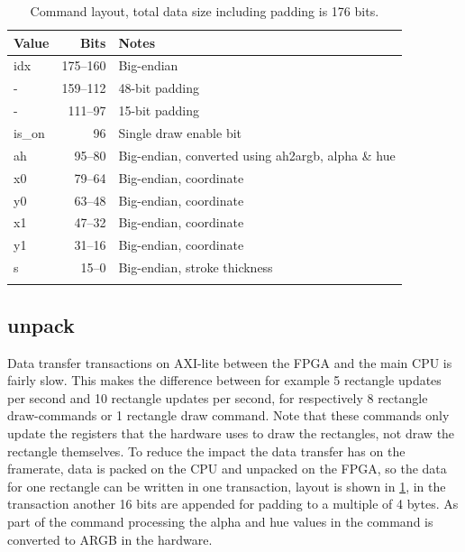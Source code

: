 \documentclass[conference]{IEEEtran}
\begin{document}
\begin{table}[h]
    \centering
    \begin{tabular}{lrp{5.5cm}}
        \toprule
        \textbf{Value} & \textbf{Bits} & \textbf{Notes} \\
        \midrule
        idx & \numrange{175}{160} & Big-endian \\
        - & \numrange{159}{112} & 48-bit padding \\
        \midrule
        - & \numrange{111}{97} & 15-bit padding \\
        is\_on & \num{96} & Single draw enable bit \\
        ah & \numrange{95}{80} & Big-endian, converted using ah2argb, alpha \& hue \\
        x0 & \numrange{79}{64} & Big-endian, coordinate \\
        y0 & \numrange{63}{48} & Big-endian, coordinate \\
        x1 & \numrange{47}{32} & Big-endian, coordinate \\
        y1 & \numrange{31}{16} & Big-endian, coordinate \\
        s & \numrange{15}{0} & Big-endian, stroke thickness \\
        \bottomrule \\
    \end{tabular}
    \caption{Command layout, total data size including padding is \num{176} bits.}
    \label{tab:command-layout}
\end{table}

\subsection{unpack}
\label{ssec:unpack}
Data transfer transactions on AXI-lite between the FPGA and the main CPU is fairly slow. This makes the difference between for example 5 rectangle updates per second and 10 rectangle updates per second, for respectively 8 rectangle draw-commands or 1 rectangle draw command. Note that these commands only update the registers that the hardware uses to draw the rectangles, not draw the rectangle themselves. To reduce the impact the data transfer has on the framerate, data is packed on the CPU and unpacked on the FPGA, so the data for one rectangle can be written in one transaction, layout is shown in \cref{tab:command-layout}, in the transaction another 16 bits are appended for padding to a multiple of 4 bytes. As part of the command processing the alpha and hue values in the command is converted to ARGB in the hardware.
\end{document}
